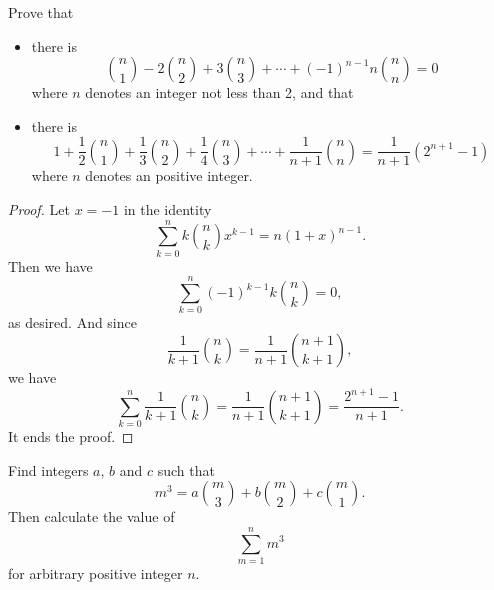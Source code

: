 \documentclass{assignment}[2019/10/15]
\begin{document}
    \begin{problem}
        Prove that
        \begin{itemize}
            \item there is
                \begin{equation}
                    \binom n1-2\binom n2 + 3\binom n3+\dotsb+(-1)^{n-1}n\binom nn=0
                \end{equation}
                where $n$ denotes an integer not less than 2, and that
            \item there is
                \begin{equation}
                    1+\frac{1}{2}\binom n1 + \frac{1}{3}\binom n2 + \frac{1}{4}\binom n3 + \dotsb + \frac{1}{n+1}\binom nn=\frac{1}{n+1}(2^{n+1}-1)
                \end{equation}
                where $n$ denotes an positive integer.
        \end{itemize}
    \end{problem}
    \begin{proof}
        Let $x=-1$ in the identity
        \begin{equation}
            \sum_{k=0}^n k\binom nk x^{k-1}=n(1+x)^{n-1}.
        \end{equation}
        Then we have
        \begin{equation}
            \sum_{k=0}^n (-1)^{k-1}k\binom nk =0,
        \end{equation}
        as desired. And since
        \begin{equation}
            \frac{1}{k+1}\binom nk = \frac{1}{n+1}\binom{n+1}{k+1},
        \end{equation}
        we have
        \begin{equation}
            \sum_{k=0}^n \frac{1}{k+1}\binom{n}{k}=\frac{1}{n+1}\binom{n+1}{k+1}=\frac{2^{n+1}-1}{n+1}.
        \end{equation}
        It ends the proof.
    \end{proof}
    \begin{problem}
        Find integers $a$, $b$ and $c$ such that
        \begin{equation}
            m^3 = a\binom{m}{3} + b\binom m2 + c\binom m1.
        \end{equation}
        Then calculate the value of
        \begin{equation}
            \sum_{m=1}^{n}m^3
        \end{equation}
        for arbitrary positive integer $n$.
    \end{problem}
\end{document}
